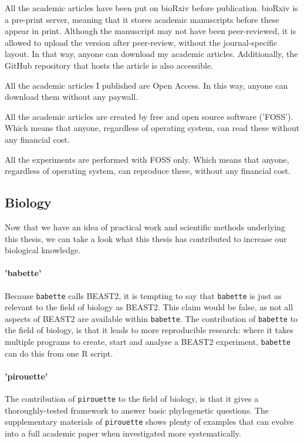 All the academic articles have been put on bioRxiv before publication.
bioRxiv is a pre-print server, meaning that it stores academic manuscripts
before these appear in print. Although the manuscript may not have been
peer-reviewed, it is allowed to upload the version after peer-review,
without the journal-specific layout. In that way, anyone can download
my academic articles. Additionally, the GitHub repository that hosts
the article is also accessible.

All the academic articles I published are Open Access. 
In this way, anyone can download them without any paywall.

All the academic articles are created by free and open source software ('FOSS').
Which means that anyone, regardless of operating system, can
read these without any financial cost.

All the experiments are performed with FOSS only.
Which means that anyone, regardless of operating system, can
reproduce these, without any financial cost.

\subsection{Biology}

Now that we have an idea of practical work and scientific methods underlying
this thesis, we can take a look what this thesis has contributed to
increase our biological knowledge. 

\paragraph{'babette'}

Because \verb;babette; calls BEAST2, it is tempting to say that \verb;babette;
is just as relevant to the field of biology as BEAST2. 
This claim would be false, as not all aspects of BEAST2 are available
within \verb;babette;. The contribution of \verb;babette; to the field of biology, 
is that it leads to more reproducible research: where it takes multiple
programs to create, start and analyse a BEAST2 experiment, \verb;babette;
can do this from one R script. 

\paragraph{'pirouette'} 

The contribution of \verb;pirouette; to the field of biology, 
is that it gives a thoroughly-tested framework to answer
basic phylogenetic questions. The supplementary materials 
of \verb;pirouette; shows plenty of examples that can evolve into
a full academic paper when investigated more systematically.

